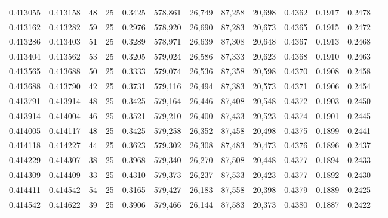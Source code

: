 \begin{tabular}{rrrrrrrrrrrrr}
0.413055 & 0.413158 &    48 &  25 &                                     0.3425 & 578,861 &  26,749 &  87,258 &  20,698 & 0.4362 & 0.1917 & 0.2478 \\
0.413162 & 0.413282 &    59 &  25 &                                     0.2976 & 578,920 &  26,690 &  87,283 &  20,673 & 0.4365 & 0.1915 & 0.2472 \\
0.413286 & 0.413403 &    51 &  25 &                                     0.3289 & 578,971 &  26,639 &  87,308 &  20,648 & 0.4367 & 0.1913 & 0.2468 \\
0.413404 & 0.413562 &    53 &  25 &                                     0.3205 & 579,024 &  26,586 &  87,333 &  20,623 & 0.4368 & 0.1910 & 0.2463 \\
0.413565 & 0.413688 &    50 &  25 &                                     0.3333 & 579,074 &  26,536 &  87,358 &  20,598 & 0.4370 & 0.1908 & 0.2458 \\
0.413688 & 0.413790 &    42 &  25 &                                     0.3731 & 579,116 &  26,494 &  87,383 &  20,573 & 0.4371 & 0.1906 & 0.2454 \\
0.413791 & 0.413914 &    48 &  25 &                                     0.3425 & 579,164 &  26,446 &  87,408 &  20,548 & 0.4372 & 0.1903 & 0.2450 \\
0.413914 & 0.414004 &    46 &  25 &                                     0.3521 & 579,210 &  26,400 &  87,433 &  20,523 & 0.4374 & 0.1901 & 0.2445 \\
0.414005 & 0.414117 &    48 &  25 &                                     0.3425 & 579,258 &  26,352 &  87,458 &  20,498 & 0.4375 & 0.1899 & 0.2441 \\
0.414118 & 0.414227 &    44 &  25 &                                     0.3623 & 579,302 &  26,308 &  87,483 &  20,473 & 0.4376 & 0.1896 & 0.2437 \\
0.414229 & 0.414307 &    38 &  25 &                                     0.3968 & 579,340 &  26,270 &  87,508 &  20,448 & 0.4377 & 0.1894 & 0.2433 \\
0.414309 & 0.414409 &    33 &  25 &                                     0.4310 & 579,373 &  26,237 &  87,533 &  20,423 & 0.4377 & 0.1892 & 0.2430 \\
0.414411 & 0.414542 &    54 &  25 &                                     0.3165 & 579,427 &  26,183 &  87,558 &  20,398 & 0.4379 & 0.1889 & 0.2425 \\
0.414542 & 0.414622 &    39 &  25 &                                     0.3906 & 579,466 &  26,144 &  87,583 &  20,373 & 0.4380 & 0.1887 & 0.2422 \\

\end{tabular}
